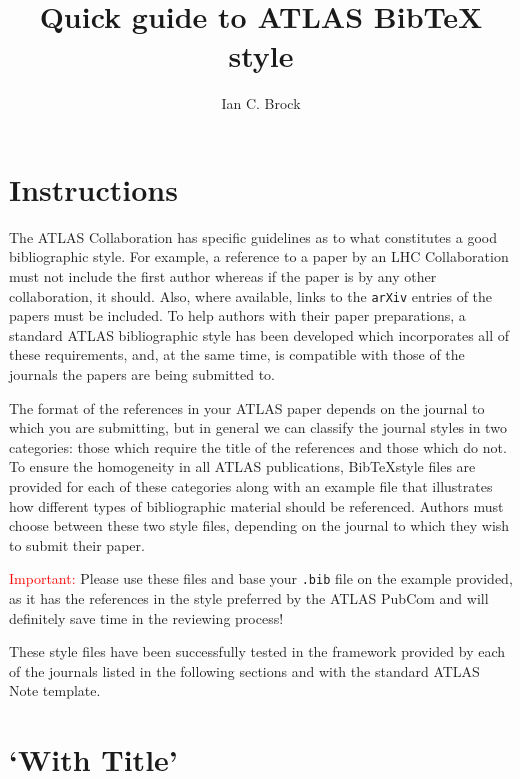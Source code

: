 \documentclass{../atlasnote}
\title{Quick guide to ATLAS BibTeX style}
\author{Ian C. Brock}
\newcommand*{\BibTeX}{Bib\TeX}
\begin{document}
 

\maketitle

\section{Instructions}

The ATLAS Collaboration has specific guidelines as to what constitutes a good bibliographic style. 
For example, a reference to a paper by an LHC Collaboration must not include the first author whereas if the paper is by any other collaboration, it should. 
Also, where available, links to the \texttt{arXiv} entries of the papers must be included. 
To help authors with their paper preparations, a standard ATLAS bibliographic style has been developed which incorporates all of these requirements, 
and, at the same time, is compatible with those of the journals the papers are being submitted to. 

The format of the references in your ATLAS paper depends on the journal to which you are submitting,
but in general we can classify the journal styles in two categories: those which require the title of the references and those which do not. 
To ensure the homogeneity in all ATLAS publications, 
\BibTeX style files are provided for each of these categories along with an example file that illustrates how different types of bibliographic material should be referenced.
Authors must choose between these two style files, depending on the journal to which they wish to submit their paper.

\noindent \textcolor{red}{Important:} Please use these files and base your \texttt{.bib} file on the example provided,
as it has the references in the style preferred by the ATLAS PubCom and will definitely save time in the reviewing process!

\noindent These style files have been successfully tested in the framework provided by each of the journals listed in the following sections and with the standard ATLAS Note template.

\section{`With Title'}
\end{document}
